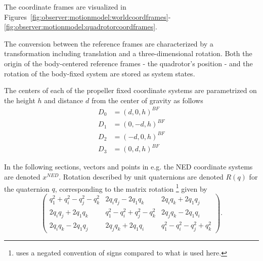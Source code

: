         The coordinate frames are visualized in Figures~\ref{fig:observer:motionmodel:worldcoordframes}-\ref{fig:observer:motionmodel:quadrotorcoordframes}.

        The conversion between the reference frames are characterized by a
        transformation including translation and a three-dimensional rotation.
        Both the origin of the body-centered reference frames
        - the quadrotor's position - and the rotation of the body-fixed
        system are stored as system states.

        The centers of each of the propeller fixed coordinate systems
        are parametrized on the height $h$ and distance $d$ from the center of
        gravity as follows
        \begin{align}
            D_{0} &= (d, 0, h)^{BF} \\
            D_{1} &= (0, -d, h)^{BF} \\
            D_{2} &= (-d, 0, h)^{BF} \\
            D_{3} &= (0, d, h)^{BF}
        \end{align}

        In the following sections, vectors and points in e.g. the NED
        coordinate systems are denoted $x^{NED}$.
        Rotation described by unit quaternions are denoted $R(q)$ for
        the quaternion $q$, corresponding to the matrix rotation
        \citep{kuipers2002quaternions}\footnote{\citep{kuipers2002quaternions} uses a negated convention of signs compared to what is used here.}
        given by
        \begin{equation}
            \left(
            \begin{array}{cccc}
                q_{1}^{2} + q_{i}^{2} - q_{j}^{2} - q_{k}^{2}   & 2q_{i}q_{j}-2q_{1}q_{k}                       & 2q_{i}q_{k} + 2q_{1}q_{j} \\
                2q_{i}q_{j} + 2q_{1}q_{k}                       & q_{1}^{2} - q_{i}^{2} + q_{j}^{2} - q_{k}^{2} & 2q_{j}q_{k} - 2q_{1}q_{i} \\
                2q_{i}q_{k} - 2q_{1}q_{j}                       & 2q_{j}q_{k} + 2q_{1}q_{i}                     & q_{1}^{2} - q_{i}^{2} - q_{j}^{2} + q_{k}^{2}
            \end{array}
            \right) .
        \end{equation}

